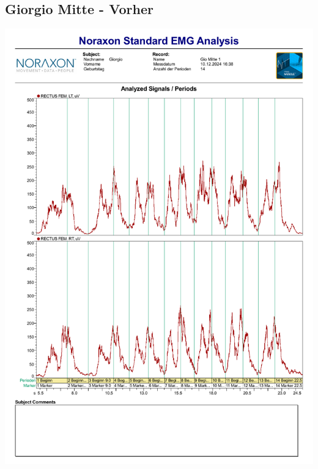 \subsection*{Giorgio Mitte - Vorher}
\includegraphics[width=.9\textwidth]{img/pdfs/Gio_Mitte_1.pdf}
\clearpage


